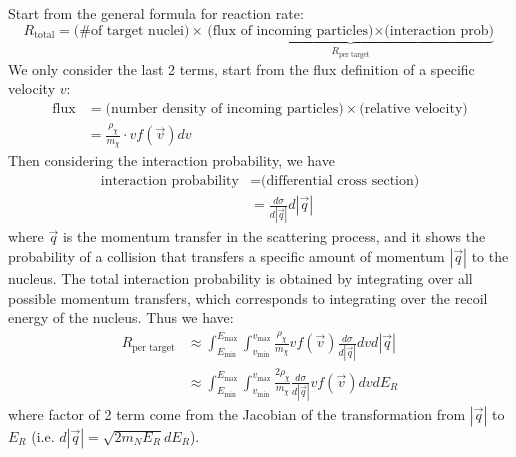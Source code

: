 \bigskip \noindent
\begin{foundation}
    Start from the general formula for reaction rate:
    \[
        R_\text{total} = \text{(\# of target nuclei)} \times \underbrace{\text{(flux of incoming particles)} \times \text{(interaction prob)} }_{R_\text{per target}}
    \]
    We only consider the last 2 terms, start from the flux definition of a specific velocity $v$:
    \begin{align*}
        \text{flux} &= \text{(number density of incoming particles)} \times \text{(relative velocity)} \\
        &= \frac{\rho_\chi}{m_\chi} \cdot v f(\vec{v}) dv
    \end{align*}
    Then considering the interaction probability, we have
    \begin{align*}
        \text{interaction probability} &= \text{(differential cross section)} \\
        &= \frac{d\sigma}{d |\vec{q}|} d|\vec{q}|
    \end{align*}
    where $\vec{q}$ is the momentum transfer in the scattering process, and it shows the probability of a collision that transfers a specific amount of momentum $|\vec{q}|$ to the nucleus. The total interaction probability is obtained by integrating over all possible momentum transfers, which corresponds to integrating over the recoil energy of the nucleus. Thus we have:
    \begin{align*}
        R_\text{per target} &\approx \int_{E_{\mathrm{min}}}^{E_{\mathrm{max}}} \int_{v_{\mathrm{min}}}^{v_{\mathrm{max}}} \frac{\rho_\chi}{m_\chi} v f(\vec{v}) \frac{d\sigma}{d |\vec{q}|} dv d|\vec{q}| \\
        &\approx \int_{E_{\mathrm{min}}}^{E_{\mathrm{max}}} \int_{v_{\mathrm{min}}}^{v_{\mathrm{max}}} \frac{2 \rho_\chi}{m_\chi} \frac{d\sigma}{d |\vec{q}|} v f(\vec{v}) dv dE_R
    \end{align*}
    where factor of 2 term come from the Jacobian of the transformation from $|\vec{q}|$ to $E_R$ (i.e. $d|\vec{q}| = \sqrt{2 m_N E_R} dE_R$). \\


\end{foundation}
